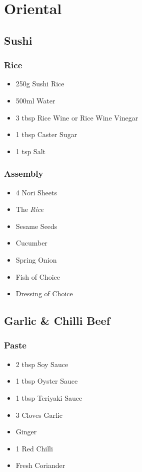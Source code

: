 \documentclass[11pt, english]{article}
\begin{document}
\newpage

\section{Oriental}

	\subsection{Sushi}

		\subsubsection*{Rice}

	\begin{itemize}
	\setlength\itemsep{0cm}
		\item 250g Sushi Rice
		\item 500ml Water
		\item 3 tbsp Rice Wine or Rice Wine Vinegar
		\item 1 tbsp Caster Sugar
		\item 1 tsp Salt
	\end{itemize}

		\subsubsection*{Assembly}

	\begin{itemize}
	\setlength\itemsep{0cm}
		\item 4 Nori Sheets
		\item The \textit{Rice}
		\item Sesame Seeds
		\item Cucumber
		\item Spring Onion
		\item Fish of Choice
		\item Dressing of Choice
	\end{itemize}

\newpage

	\subsection{Garlic \& Chilli Beef}

		\subsubsection*{Paste}

	\begin{itemize}
        \setlength\itemsep{0cm}
                \item 2 tbsp Soy Sauce
		\item 1 tbsp Oyster Sauce
		\item 1 tbsp Teriyaki Sauce
		\item 3 Cloves Garlic
		\item Ginger
		\item 1 Red Chilli
		\item Fresh Coriander 
        \end{itemize}
\end{document}
